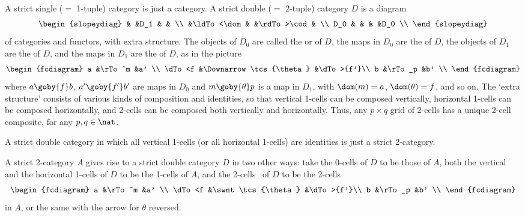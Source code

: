 A strict single ($=$ 1-tuple) category is just a category.  A strict
double%
%
%
($=$ 2-tuple) category $D$ is a diagram  
\[
\begin{slopeydiag}
	&	&D_1	&	&	\\
	&\ldTo<\dom&	&\rdTo>\cod&	\\
D_0	&	&	&	&D_0	\\
\end{slopeydiag}
\]
of categories and functors, with extra structure.  The objects of $D_0$ are
called the %
%
%
or  of $D$, the maps in $D_0$ are
the  of $D$, the objects of $D_1$ are the
 of $D$, and the maps in $D_1$ are the
 of $D$, as in the picture
%
\begin{equation}	\label{diag:str-dbl-two-cell}
\begin{fcdiagram}
a	&\rTo^m			&a'	\\
\dTo<f	&\Downarrow\tcs{\theta}	&\dTo>{f'}\\
b	&\rTo_p			&b'	\\
\end{fcdiagram}
\end{equation}
%
where $a \goby{f} b$, $a' \goby{f'} b'$ are maps in $D_0$ and $m
\goby{\theta} p$ is a map in $D_1$, with $\dom(m) = a$, $\dom(\theta)=f$,
and so on.  The `extra structure' consists of various kinds of composition
and identities, so that vertical 1-cells can be composed vertically,
horizontal 1-cells can be composed horizontally, and 2-cells can be
composed both vertically and horizontally.  Thus, any $p \times q$ grid of
2-cells has a unique 2-cell composite, for any $p, q \in \nat$.

\begin{example}	
A strict double category in which all vertical 1-cells (or all horizontal
1-cells) are identities is just a strict 2-category.  
\end{example}

\begin{example}
A strict 2-category $A$ gives rise to a strict double category $D$ in two
other ways: take the 0-cells of $D$ to be those of $A$, both the
vertical and the horizontal 1-cells of $D$ to be the 1-cells of $A$, and
the 2-cells~ of $D$ to be the 2-cells
\[
\begin{fcdiagram}
a	&\rTo^m			&a'	\\
\dTo<f	&\swnt\tcs{\theta}	&\dTo>{f'}\\
b	&\rTo_p			&b'	\\
\end{fcdiagram}
\]
in $A$, or the same with the arrow for $\theta$ reversed.
\end{example}

